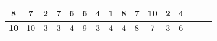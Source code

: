\documentclass[twocolumn,10pt]{asme2ej}
\begin{document}
\begin{table}[!htb]
\begin{tabular}{|c|c|c|c|c|c|c|c|c|c|c|c|c|c|c|c|}
		\textbf{8}                   & 7                             & 2                              & 7                   & 6                              & 6                            & 4       & 1                            & 8                             & 7            & 10                            & 2                       & 4                   \\ \hline
		\textbf{10}                  & 10                            & 3                              & 3                  & 4                              & 9                            & 3 	     & 4                            & 4                             & 8                          & 7                             & 3                       & 6                   \\ \hline   
	\end{tabular}
\end{table}
\end{document}
